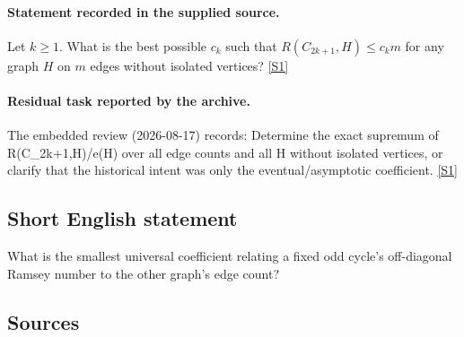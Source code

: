 \documentclass[11pt,a4paper]{article}
\newcommand{\sref}[2]{\hyperlink{source:#1:#2}{[S#2]}}
\begin{document}
\paragraph{Statement recorded in the supplied source.}
Let $k\geq 1$. What is the best possible $c_k$ such that $ R(C_{2k+1},H)\leq c_k m $ for any graph $H$ on $m$ edges without isolated vertices? \sref{2185}{1}

\paragraph{Residual task reported by the archive.}

The embedded review (2026-08-17) records: Determine the exact supremum of R(C\_{2k+1},H)/e(H) over all edge counts and all H without isolated vertices, or clarify that the historical intent was only the eventual/asymptotic coefficient. \sref{2185}{1}

\subsection{Short English statement}

What is the smallest universal coefficient relating a fixed odd cycle's off-diagonal Ramsey number to the other graph's edge count?

\subsection{Sources}
\end{document}
